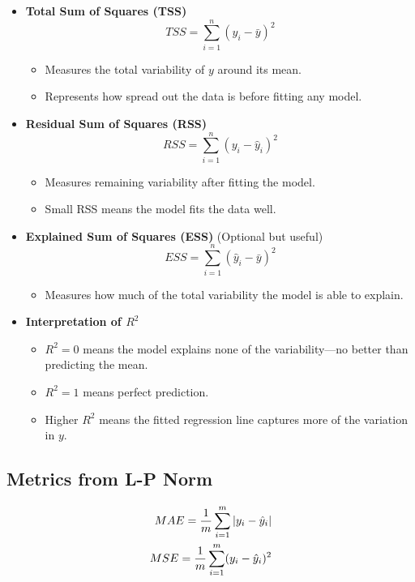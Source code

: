\documentclass[10pt,a4paper]{article}
\begin{document}
	\begin{itemize}

		\item \textbf{Total Sum of Squares (TSS)}
		 			\[
			TSS = \sum_{i=1}^n (y_i - \bar{y})^2
			\]

		\begin{itemize}
			\item Measures the total variability of $y$ around its mean.
			\item Represents how spread out the data is before fitting any model.
		\end{itemize}

		\item \textbf{Residual Sum of Squares (RSS)}
		 			\[
			RSS = \sum_{i=1}^n (y_i - \hat{y}_i)^2
			\]

		\begin{itemize}
			\item Measures remaining variability after fitting the model.
			\item Small RSS means the model fits the data well.
		\end{itemize}

		\item \textbf{Explained Sum of Squares (ESS)} (Optional but useful)
		 			\[
			ESS = \sum_{i=1}^n (\hat{y}_i - \bar{y})^2
			\]


		\begin{itemize}
			\item Measures how much of the total variability the model is able to explain.
		\end{itemize}

		\item \textbf{Interpretation of $R^2$}
		\begin{itemize}
			\item $R^2 = 0$ means the model explains none of the variability—no better than predicting the mean.
			\item $R^2 = 1$ means perfect prediction.
			\item Higher $R^2$ means the fitted regression line captures more of the variation in $y$.
		\end{itemize}


	\end{itemize}


	\subsection{Metrics from L-P Norm}
	\begin{align*}
			\Large MAE = \frac{1}{m}\sum^{m}_{i=1}|y_i -\hat{y}_i| \Large\\
			\Large MSE = \frac{1}{m}\sum^{m}_{i=1}(y_i -\hat{y}_i)^2 \Large
	\end{align*}
\end{document}

